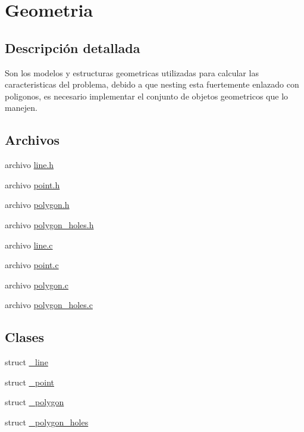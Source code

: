 \hypertarget{group__geometry}{
\section{Geometria}
\label{group__geometry}
}


\subsection{Descripci\'{o}n detallada}
Son los modelos y estructuras geometricas utilizadas para calcular las caracteristicas del problema, debido a que nesting esta fuertemente enlazado con poligonos, es necesario implementar el conjunto de objetos geometricos que lo manejen. 

\subsection*{Archivos}
\begin{CompactItemize}
\item 
archivo \hyperlink{line_8h}{line.h}
\item 
archivo \hyperlink{point_8h}{point.h}
\item 
archivo \hyperlink{polygon_8h}{polygon.h}
\item 
archivo \hyperlink{polygon__holes_8h}{polygon\_\-holes.h}
\item 
archivo \hyperlink{line_8c}{line.c}
\item 
archivo \hyperlink{point_8c}{point.c}
\item 
archivo \hyperlink{polygon_8c}{polygon.c}
\item 
archivo \hyperlink{polygon__holes_8c}{polygon\_\-holes.c}
\end{CompactItemize}
\subsection*{Clases}
\begin{CompactItemize}
\item 
struct \hyperlink{struct__line}{\_\-line}
\item 
struct \hyperlink{struct__point}{\_\-point}
\item 
struct \hyperlink{struct__polygon}{\_\-polygon}
\item 
struct \hyperlink{struct__polygon__holes}{\_\-polygon\_\-holes}
\end{CompactItemize}
